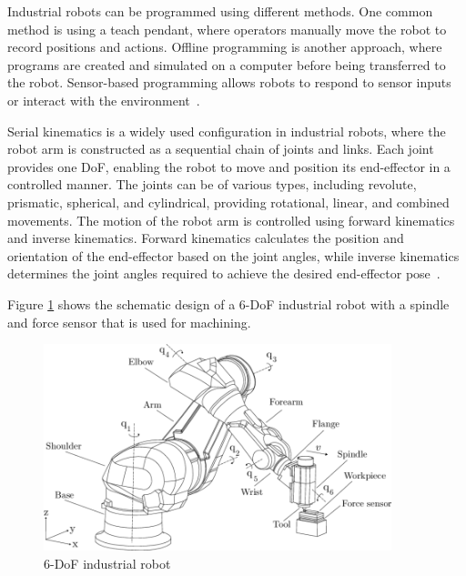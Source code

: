 Industrial robots can be programmed using different methods. One common method is using a teach pendant, where operators manually move the robot to record positions and actions. Offline programming is another approach, where programs are created and simulated on a computer before being transferred to the robot. Sensor-based programming allows robots to respond to sensor inputs or interact with the environment~\cite{Heimann.2020}. %


Serial kinematics is a widely used configuration in industrial robots, where the robot arm is constructed as a sequential chain of joints and links. Each joint provides one \acrshort{DoF}, enabling the robot to move and position its end-effector in a controlled manner. The joints can be of various types, including revolute, prismatic, spherical, and cylindrical, providing rotational, linear, and combined movements. The motion of the robot arm is controlled using forward kinematics and inverse kinematics. Forward kinematics calculates the position and orientation of the end-effector based on the joint angles, while inverse kinematics determines the joint angles required to achieve the desired end-effector pose~\cite{Singh.2021b}. %


Figure \ref{robot} shows the schematic design of a 6-\acrshort{DoF} industrial robot with a spindle and force sensor that is used for machining.

\begin{figure}[H]
	\centerline{\includegraphics[width=0.9\textwidth]{figures/robot.png}}
	\caption{6-DoF industrial robot~\cite{HuynhHoaiNam.2018}}
	\label{robot}
\end{figure}

